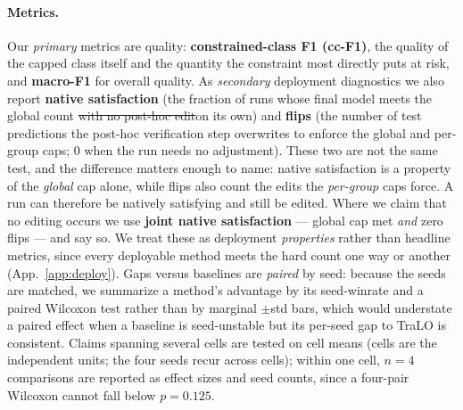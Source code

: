 \documentclass[10pt]{article}
\newcommand{\del}[1]{{\color{red}\sout{#1}}}
\begin{document}
\paragraph{Metrics.}
Our \emph{primary} metrics are quality: \textbf{constrained-class F1
(cc-F1)}, the quality of the capped class itself and the quantity the
constraint most directly puts at risk, and \textbf{macro-F1} for overall
quality. As \emph{secondary} deployment diagnostics we also report
\textbf{native satisfaction} (the fraction of runs whose final model meets
the global count \del{with no post-hoc edit}{\color{blue}on its own}) and
\textbf{flips} (the number of
test predictions the post-hoc verification step overwrites to enforce the
global and per-group caps; $0$ when the run needs no adjustment).
{\color{blue}These two are not the same test, and the difference matters enough
to name: native satisfaction is a property of the \emph{global} cap alone, while
flips also count the edits the \emph{per-group} caps force. A run can therefore
be natively satisfying and still be edited. Where we claim that no editing
occurs we use \textbf{joint native satisfaction} --- global cap met \emph{and}
zero flips --- and say so.} We treat
these as deployment \emph{properties} rather than headline metrics, since
every deployable method meets the hard count one way or another
(App.~\ref{app:deploy}). Gaps versus baselines are \emph{paired} by seed:
because the seeds are matched, we summarize a method's advantage by its
seed-winrate and a paired Wilcoxon test rather than by marginal $\pm$std
bars, which would understate a paired effect when a baseline is
seed-unstable but its per-seed gap to TraLO is consistent. Claims spanning
several cells are tested on cell means (cells are the independent units;
the four seeds recur across cells); within one cell, $n{=}4$ comparisons
are reported as effect sizes and seed counts, since a four-pair Wilcoxon
cannot fall below $p{=}0.125$.
\end{document}
